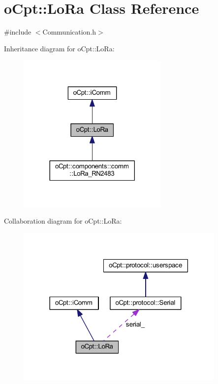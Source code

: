 \hypertarget{classo_cpt_1_1_lo_ra}{}\section{o\+Cpt\+:\+:Lo\+Ra Class Reference}
\label{classo_cpt_1_1_lo_ra}


{\ttfamily \#include $<$Communication.\+h$>$}



Inheritance diagram for o\+Cpt\+:\+:Lo\+Ra\+:\nopagebreak
\begin{figure}[H]
\begin{center}
\leavevmode
\includegraphics[width=209pt]{classo_cpt_1_1_lo_ra__inherit__graph}
\end{center}
\end{figure}


Collaboration diagram for o\+Cpt\+:\+:Lo\+Ra\+:\nopagebreak
\begin{figure}[H]
\begin{center}
\leavevmode
\includegraphics[width=290pt]{classo_cpt_1_1_lo_ra__coll__graph}
\end{center}
\end{figure}
